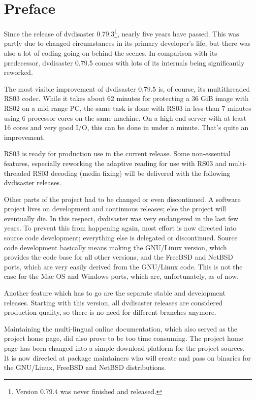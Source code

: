\section*{Preface}
\label{preface}

Since the release of dvdisaster 0.79.3\footnote{Version 0.79.4 was never finished
and released.}, nearly five years have passed.
This was partly due to changed circumstances in its
primary developer's life, but there was also a lot of
coding going on behind the scenes. In comparison with its
predecessor, dvdisaster 0.79.5 comes with lots of its
internals being significantly reworked.

\smallskip

The most visible improvement  of dvdisaster 0.79.5 is, of
course, its multithreaded RS03 codec. While it takes
about 62 minutes for protecting a 36 GiB image with RS02
on a mid range PC,
the same task is done with RS03 in less than 7 minutes
using 6 processor cores on the same machine.
On a high end server with at least 16 cores and very good I/O,
this can be done in under a minute. That's quite an
improvement.

RS03 is ready for production use in the current release.
Some non-essential features, especially reworking the
adaptive reading for use with RS03 and multi-threaded
RS03 decoding (media fixing) will be delivered with
the following dvdisaster releases.

\smallskip

Other parts of the project had to be changed or even
discontinued. A software project lives on development
and continuous releases; else the
project will eventually die. In this respect, dvdisaster
was very endangered in the last few years.
To prevent this from happening again, most effort
is now directed into source code development;
everything else is delegated or discontinued.
Source code development basically means making
the GNU/Linux version, which provides the code base
for all other versions, and the FreeBSD and NetBSD ports,
which are very easily derived from the GNU/Linux code.
This is not the case for the Mac OS and Windows ports,
which are, unfortunately,  as of now.

Another feature which has to go are the separate
stable and development releases.
Starting with this version, all dvdisaster releases
are considered production quality, so there is no
need for different branches anymore.

\smallskip

Maintaining the multi-lingual online documentation, which
also served as the project home page, did also prove to
be too time consuming. The project home page has
been changed into a simple download platform for
the project sources. It is now directed at package
maintainers who will create and pass on binaries
for the GNU/Linux, FreeBSD and NetBSD distributions.

